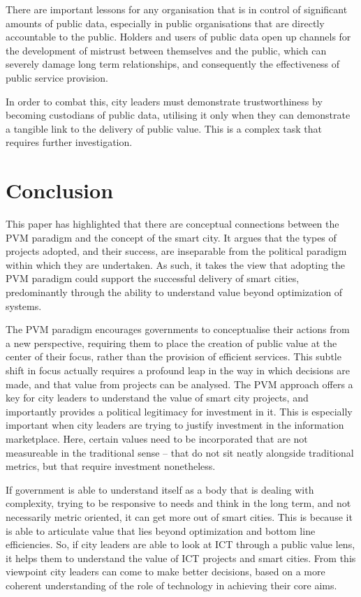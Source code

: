 \documentclass[conference]{IEEEtran}
\begin{document}
There are important lessons for any organisation that is in control of
significant amounts of public data, especially in public organisations
that are directly accountable to the public. Holders and users of
public data open up channels for the development of mistrust between
themselves and the public, which can severely damage long term
relationships, and consequently the effectiveness of public service
provision.

In order to combat this, city leaders must demonstrate trustworthiness
by becoming custodians of public data, utilising it only when they can
demonstrate a tangible link to the delivery of public value. This is a
complex task that requires further investigation.


\section{Conclusion} 
This paper has highlighted that there are conceptual connections
between the PVM paradigm and the concept of the smart city. It argues
that the types of projects adopted, and their success, are inseparable
from the political paradigm within which they are undertaken. As such,
it takes the view that adopting the PVM paradigm could support the
successful delivery of smart cities, predominantly through the ability
to understand value beyond optimization of systems.

The PVM paradigm encourages governments to conceptualise their actions
from a new perspective, requiring them to place the creation of public
value at the center of their focus, rather than the provision of
efficient services. This subtle shift in focus actually requires a
profound leap in the way in which decisions are made, and that value
from projects can be analysed. The PVM approach offers a key for city
leaders to understand the value of smart city projects, and
importantly provides a political legitimacy for investment in it. This
is especially important when city leaders are trying to justify
investment in the information marketplace. Here, certain values need
to be incorporated that are not measureable in the traditional sense
-- that do not sit neatly alongside traditional metrics, but that
require investment nonetheless.

If government is able to understand itself as a body that is dealing
with complexity, trying to be responsive to needs and think in the
long term, and not necessarily metric oriented, it can get more out of
smart cities. This is because it is able to articulate value that lies
beyond optimization and bottom line efficiencies. So, if city leaders
are able to look at ICT through a public value lens, it helps them to
understand the value of ICT projects and smart cities. From this
viewpoint city leaders can come to make better decisions, based on a
more coherent understanding of the role of technology in achieving
their core aims.
\end{document}
